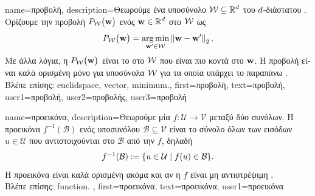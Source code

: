  {name={\foreignlanguage{greek}{προβολή}}, 
       description={\foreignlanguage{greek}{Θεωρούμε ένα υποσύνολο} 
       		$\mathcal{W} \subseteq \mathbb{R}^{d}$ \foreignlanguage{greek}{του $d$-διάστατου} 
		. \foreignlanguage{greek}{Ορίζουμε την προβολή $P_{\mathcal{W}}\big( {\bf w}\big)$ 
		ενός}  ${\bf w} \in \mathbb{R}^{d}$ \foreignlanguage{greek}{στο $\mathcal{W}$ ως}
		\begin{equation} 
   	    		\nonumber
			\label{equ_def_proj_generic_dict}
  	     		P_{\mathcal{W}}\big( {\bf w}\big) = \operatorname*{arg\,min}_{{\bf w}' \in \mathcal{W}} \left\Vert {{\bf w}- {\bf w}'} \right\Vert_{2}. 
         	\end{equation}
		 \foreignlanguage{greek}{Με άλλα λόγια, η $P_{\mathcal{W}}\big( {\bf w}\big)$ είναι το}  
		 \foreignlanguage{greek}{στο $\mathcal{W}$ που είναι πιο κοντά στο ${\bf w}$. Η προβολή είναι καλά ορισμένη μόνο 
		 για υποσύνολα $\mathcal{W}$ για τα οποία υπάρχει το παραπάνω}  \cite{BoydConvexBook}.\\
		 \foreignlanguage{greek}{Βλέπε επίσης:} \gls{euclidspace}, \gls{vector}, \gls{minimum}.},
	first={\foreignlanguage{greek}{προβολή}},
	text={\foreignlanguage{greek}{προβολή}},
	user1={\foreignlanguage{greek}{προβολή}}, %
	user2={\foreignlanguage{greek}{προβολής}}, %
	user3={\foreignlanguage{greek}{προβολή}} %
}

{name={\foreignlanguage{greek}{προεικόνα}}, 
	description={\foreignlanguage{greek}{Θεωρούμε μία}  $f\colon \mathcal{U} \rightarrow \mathcal{V}$ 
		\foreignlanguage{greek}{μεταξύ δύο συνόλων. Η προεικόνα $f^{-1}(\mathcal{B})$ ενός υποσυνόλου $\mathcal{B} \subseteq \mathcal{V}$ 
		είναι το σύνολο όλων των εισόδων $u \in \mathcal{U}$ που αντιστοιχούνται στο $\mathcal{B}$ από την $f$, δηλαδή}
		\[
		f^{-1}(\mathcal{B}) := \{ u \in \mathcal{U} \mid f(u) \in \mathcal{B} \}.
		\]
		\foreignlanguage{greek}{Η προεικόνα είναι καλά ορισμένη ακόμα και αν η}  $f$ \foreignlanguage{greek}{είναι 
		μη αντιστρέψιμη} \cite{RudinBookPrinciplesMatheAnalysis}. \\
		\foreignlanguage{greek}{Βλέπε επίσης:} \gls{function}. },
	first={\foreignlanguage{greek}{προεικόνα}},
	text={\foreignlanguage{greek}{προεικόνα}},
	user1={\foreignlanguage{greek}{προεικόνα}} %
}


